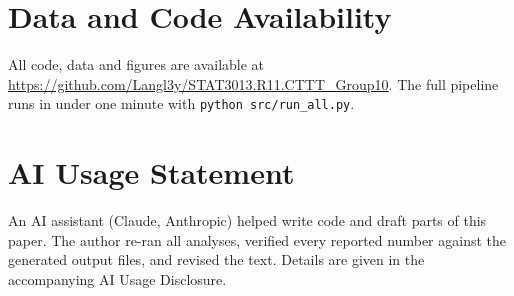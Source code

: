 \documentclass[conference]{IEEEtran}
\begin{document}
\section*{Data and Code Availability}
All code, data and figures are available at \url{https://github.com/Langl3y/STAT3013.R11.CTTT_Group10}. The full pipeline runs in under one minute with \texttt{python src/run\_all.py}.

\section*{AI Usage Statement}
An AI assistant (Claude, Anthropic) helped write code and draft parts of this paper. The author re-ran all analyses, verified every reported number against the generated output files, and revised the text. Details are given in the accompanying AI Usage Disclosure.



\end{document}
